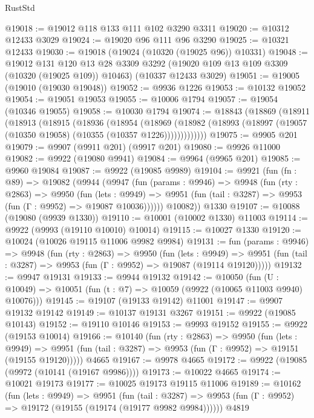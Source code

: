 \begin{lexlean}{RustStd}
\begin{coremodule}
@19018 := @19012 @118 @133 @111 @102 @3290 @3311
@19020 := @10312 @12433 @3029
@19024 := @19020 @96 @111 @96 @3290
@19025 := @10321 @12433
@19030 := @19018 (@19024 (@10320 (@19025 @96)) @10331)
@19048 := @19012
    @131
    @120
    @13
    @28
    @3309
    @3292
    (@19020 @109 @13 @109 @3309 (@10320 (@19025 @109)) @10463)
    (@10337 @12433 @3029)
@19051 := @19005 (@19010 (@19030 @19048))
@19052 := @9936 @1226
@19053 := @10132 @19052
@19054 := @19051 @19053
@19055 := @10006 @1794
@19057 := @19054 (@10346 @19055)
@19058 := @10030 @1794
@19074 := @18843
    (@18869
      (@18911
        (@18913
          (@18915
            (@18936
              (@18954
                (@18969
                  (@18982 (@18993 (@18997 (@19057 (@10350 @19058) (@10355 (@10357 @1226)))))))))))))
@19075 := @9905 @201
@19079 := @9907 (@9911 @201) (@9917 @201)
@19080 := @9926 @11000
@19082 := @9922 (@19080 @9941)
@19084 := @9964 (@9965 @201)
@19085 := @9960 @19084
@19087 := @9922 (@19085 @9989)
@19104 := @9921
    (fun (fn : @89) =>
    @19082
      (@9944
        (@9947
          (fun (params : @9946) =>
          @9948
            (fun (rty : @2863) =>
            @9950
              (fun (lets : @9949) =>
              @9951 (fun (tail : @3287) => @9953 (fun (Γ : @9952) => @19087 @10036))))))
        @10082))
    @1330
@19107 := @10088 (@19080 (@9939 @1330))
@19110 := @10001 (@10002 @1330) @11003
@19114 := @9922 (@9993 (@19110 @10010) @10014)
@19115 := @10027 @1330
@19120 := @10024 (@10026 @19115 @11006 @9982 @9984)
@19131 := fun (params : @9946) =>
  @9948
    (fun (rty : @2863) =>
    @9950
      (fun (lets : @9949) =>
      @9951 (fun (tail : @3287) => @9953 (fun (Γ : @9952) => @19087 (@19114 @19120)))))
@19132 := @9947 @19131
@19133 := @9944 @19132
@19142 := @10050
    (fun (U : @10049) => @10051 (fun (t : @7) => @10059 (@9922 (@10065 @11003 @9940) @10076)))
@19145 := @19107 (@19133 @19142) @11001
@19147 := @9907 @19132 @19142
@19149 := @10137 @19131 @3267
@19151 := @9922 (@19085 @10143)
@19152 := @19110 @10146
@19153 := @9993 @19152
@19155 := @9922 (@19153 @10014)
@19166 := @10140
    (fun (rty : @2863) =>
    @9950
      (fun (lets : @9949) =>
      @9951 (fun (tail : @3287) => @9953 (fun (Γ : @9952) => @19151 (@19155 @19120)))))
    @4665
@19167 := @9978 @4665
@19172 := @9922 (@19085 (@9972 (@10141 (@19167 @9986))))
@19173 := @10022 @4665
@19174 := @10021 @19173
@19177 := @10025 @19173 @19115 @11006
@19189 := @10162
    (fun (lets : @9949) =>
    @9951
      (fun (tail : @3287) =>
      @9953 (fun (Γ : @9952) => @19172 (@19155 (@19174 (@19177 @9982 @9984))))))
    @4819

\end{coremodule}
\end{lexlean}
